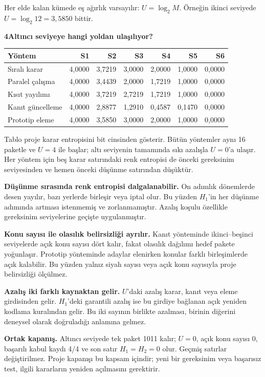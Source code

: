 \documentclass[11pt,a4paper]{article}
\newcommand{\heading}[2]{{\sffamily\small\color{blue!40!black}#1}\par{\sffamily\LARGE\bfseries#2}\par\vspace{3mm}}
\newcommand{\page}[2]{\newpage\heading{#1}{#2}}
\begin{document}
Her elde kalan kümede eş ağırlık varsayılır: $U=\log_2 M$. Örneğin ikinci seviyede $U=\log_2 12=3{,}5850$ bittir.
\page{Beş yöntemin karşılaştırılması}{4\quad Altıncı seviyeye hangi yoldan ulaşılıyor?}
\begin{center}\small\begin{tabular}{lrrrrrr}\toprule
Yöntem & S1 & S2 & S3 & S4 & S5 & S6\\\midrule
Sıralı karar & 4,0000 & 3,7219 & 3,0000 & 2,0000 & 1,0000 & 0,0000 \\
Paralel çalışma & 4,0000 & 3,4439 & 2,0000 & 1,7219 & 1,0000 & 0,0000 \\
Kısıt yayılımı & 4,0000 & 3,7219 & 2,7219 & 1,7219 & 1,0000 & 0,0000 \\
Kanıt güncelleme & 4,0000 & 2,8877 & 1,2910 & 0,4587 & 0,1470 & 0,0000 \\
Prototip eleme & 4,0000 & 3,5850 & 3,0000 & 2,0000 & 1,0000 & 0,0000 \\
\bottomrule\end{tabular}\end{center}
Tablo proje karar entropisini bit cinsinden gösterir. Bütün yöntemler aynı
16 paketle ve $U=4$ ile başlar; altı seviyenin tamamında sıkı azalışla
$U=0$'a ulaşır. Her yöntem için beş karar satırındaki renk entropisi de
önceki gereksinim seviyesinden ve hemen önceki düşünme satırından düşüktür.

\textbf{Düşünme sırasında renk entropisi dalgalanabilir.} On adımlık
dönemlerde desen yayılır, bazı yerlerde birleşir veya iptal olur. Bu yüzden
$H_1$'in her düşünme adımında artması istenmemiş ve zorlanmamıştır.
Azalış koşulu özellikle gereksinim seviyelerine geçişte uygulanmıştır.

\textbf{Konu sayısı ile olasılık belirsizliği ayrılır.} Kanıt yönteminde
ikinci--beşinci seviyelerde açık konu sayısı dört kalır, fakat olasılık
dağılımı hedef pakete yoğunlaşır. Prototip yönteminde adaylar elenirken
konular farklı birleşimlerde açık kalabilir. Bu yüzden yalnız siyah sayısı
veya açık konu sayısıyla proje belirsizliği ölçülmez.

\textbf{Azalış iki farklı kaynaktan gelir.} $U$'daki azalış karar, kanıt
veya eleme girdisinden gelir. $H_1$'deki garantili azalış ise bu girdiye
bağlanan açık yeniden kodlama kuralından gelir. Bu iki sayının birlikte
azalması, birinin diğerini deneysel olarak doğruladığı anlamına gelmez.

\textbf{Ortak kapanış.} Altıncı seviyede tek paket 1011 kalır; $U=0$,
açık konu sayısı 0, başarılı kabul kaydı 4/4 ve son satır $H_1=H_2=0$ olur.
Geçmiş satırlar değiştirilmez. Proje kapanışı bu kapsam içindir; yeni bir
gereksinim veya başarısız test, ilgili kararların yeniden açılmasını gerektirir.
\end{document}
